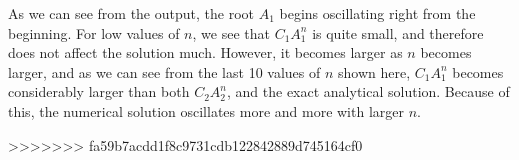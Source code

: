 \documentclass[a4paper,12pt]{report}
\begin{document}
As we can see from the output, the root $A_1$ begins oscillating right from the beginning. For low values of $n$, we see that $C_1A_1^n$ is quite small, and therefore does not affect the solution much. However, it becomes larger as $n$ becomes larger, and as we can see from the last 10 values of $n$ shown here, $C_1A_1^n$ becomes considerably larger than both $C_2A_2^n$, and the exact analytical solution. Because of this, the numerical solution oscillates more and more with larger $n$. 






>>>>>>> fa59b7acdd1f8c9731cdb122842889d745164cf0
\end{document}
